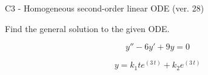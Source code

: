 \begin{exercise}
  \begin{exerciseTitle}C3 - Homogeneous second-order linear ODE (ver. 28)\end{exerciseTitle}
  \begin{exerciseStatement}
    
Find the general solution to the given ODE.

    
\[y''-6y'+9y = 0\]

  \end{exerciseStatement}
  \begin{exerciseAnswer}
    
\[y= k_{1} t e^{\left(3 \, t\right)} + k_{2} e^{\left(3 \, t\right)}\]

  \end{exerciseAnswer}
\end{exercise}